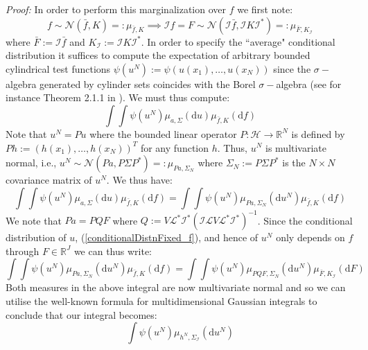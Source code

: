 \noindent \textit{Proof:}
In order to perform this marginalization over $f$ we first note:
\begin{equation}
    f\sim\mathcal{N}(\bar{f},K)=:\mu_{\bar{f},K} \implies \mathcal{I}f=F\sim\mathcal{N}(\mathcal{I}\bar{f},\mathcal{I}K\mathcal{I}^{*})=:\mu_{\bar{F},K_{\mathcal{I}}}
\end{equation}
where $\bar{F}:=\mathcal{I}\bar{f}$ and $K_{\mathcal{I}}:=\mathcal{I}K\mathcal{I}^{*}$. In order to specify the ``average" conditional distribution it suffices to compute the expectation of arbitrary bounded cylindrical test functions $\psi(u^{N}):=\psi(u(x_1),\dots,u(x_{N}))$ since the $\sigma-$algebra generated by cylinder sets coincides with the Borel $\sigma-$algebra (see for instance Theorem 2.1.1 in \textcolor{blue}{\cite{lunardi2015infinite}}). We must thus compute:
\begin{equation}
    \int\int\psi(u^{N})\mu_{a,\Sigma}(\mathrm{d}u)\mu_{\bar{f},K}(\mathrm{d}f)
\end{equation}
Note that $u^{N}=Pu$ where the bounded linear operator $P:\mathcal{H}\rightarrow\mathbb{R}^{N}$ is defined by $Ph:=(h(x_1),\dots,h(x_N))^T$ for any function $h$. Thus, $u^{N}$ is multivariate normal, i.e., $u^{N}\sim\mathcal{N}(Pa,P\Sigma P^{*})=:\mu_{Pa,\Sigma_{N}}$ where $\Sigma_{N}:=P\Sigma P^{*}$ is the $N\times N$ covariance matrix of $u^{N}$. We thus have:
\begin{equation}
    \int\int\psi(u^{N})\mu_{a,\Sigma}(\mathrm{d}u)\mu_{\bar{f},K}(\mathrm{d}f) = \int\int\psi(u^{N})\mu_{Pa,\Sigma_N}(\mathrm{d}u^{N})\mu_{\bar{f},K}(\mathrm{d}f)
\end{equation}
We note that $Pa=PQF$ where $Q:= V\mathcal{L}^{*}\mathcal{I}^{*}(\mathcal{I}\mathcal{L}V\mathcal{L}^{*}\mathcal{I}^{*})^{-1}$. Since the conditional distribution of $u$, (\ref{conditionalDistnFixed_f}), and hence of $u^{N}$ only depends on $f$ through $F\in\mathbb{R}^{J}$ we can thus write:
\begin{equation}
    \int\int\psi(u^{N})\mu_{Pa,\Sigma_N}(\mathrm{d}u^{N})\mu_{\bar{f},K}(\mathrm{d}f)=\int\int\psi(u^{N})\mu_{PQF,\Sigma_N}(\mathrm{d}u^{N})\mu_{\bar{F},K_{\mathcal{I}}}(\mathrm{d}F)
\end{equation}
Both measures in the above integral are now multivariate normal and so we can utilise the well-known formula for multidimensional Gaussian integrals to conclude that our integral becomes:
\begin{equation}
    \int\psi(u^{N})\mu_{h^{N},\Sigma_{\mathcal{I}}}(\mathrm{d}u^{N})
\end{equation}
